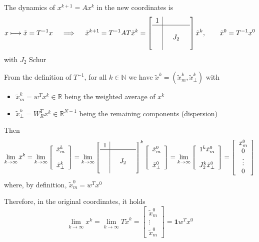 \documentclass{book}
\newcommand{\R}{\mathbb{R}}
\newcommand{\N}{\mathbb{N}}
\theoremstyle{theoremv2}
\theoremstyle{defv2}
\theoremstyle{remark}
\theoremstyle{remark}
\theoremstyle{definition}
\theoremstyle{definition}
\begin{document}
The dynamics of $x^{k+1}=Ax^k$ in the new coordinates is 
\[
    x \longmapsto \tilde{x} = T^{-1}x \quad \implies \quad \tilde{x}^{k+1} = T^{-1}AT\tilde{x}^k = \left[\begin{array}{c| c c c }
        1 & & & \\ \hline \\ & & J_2 & \\ & & & 
    \end{array}\right] \tilde{x}^k, \qquad \tilde{x}^0 = T^{-1}x^0
\]
with $J_2$ Schur

From the definition of $T^{-1}$, for all $k\in\N$ we have $\tilde{x}^k=(\tilde{x}_m^k,\tilde{x}_\perp^k)$ with 
\begin{itemize}
    \item $\tilde{x}_m^k = w^T x^k\in\R$ being the weighted average of $x^k$ 
    \item $\tilde{x}_\perp^k=W_R^Tx^k\in\R^{N-1}$ being the remaining components (dispersion) 
\end{itemize}
Then 
\[
    \lim_{k\to\infty} \tilde{x}^k = \lim_{k\to\infty} \left[\begin{array}{c}
        \tilde{x}_m^k \\ \\ \tilde{x}_\perp^k
    \end{array}\right] = \lim_{k\to\infty}\left[\begin{array}{c| c c c }
        1 & & & \\ \hline \\ & & J_2 & \\ & & & 
    \end{array}\right]^k \left[\begin{array}{c}
        \tilde{x}_m^0 \\ \\ \tilde{x}_\perp^0
    \end{array}\right] = \lim_{k\to\infty} \left[\begin{array}{c}
        1^k \tilde{x}_m^0 \\ \\ J_2^k\tilde{x}_\perp^0
    \end{array}\right] = \left[\begin{array}{c}
        \tilde{x}_m^0 \\ 0 \\ \vdots \\ 0
    \end{array}\right]
\]
where, by definition, $\tilde{x}_m^0=w^Tx^0$

Therefore, in the original coordinates, it holds 
\[
    \lim_{k\to\infty} x^k = \lim_{k\to\infty} T\tilde{x}^k = \left[\begin{array}{c}
        \tilde{x}_m^0 \\ \vdots \\ \tilde{x}_m^0
    \end{array}\right] = \boldsymbol{1}w^Tx^0
\]
\end{document}
